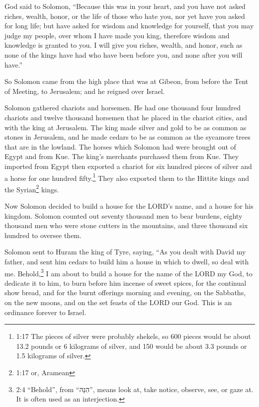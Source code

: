 \myverse{}God said to Solomon, “Because this was in your heart, and you
have not asked riches, wealth, honor, or the life of those who hate you, nor yet have you asked for long
life; but have asked for wisdom and knowledge for yourself, that you may judge my people, over whom I
have made you king,
\myverse{}therefore wisdom and knowledge is granted to you. I will give you riches,
wealth, and honor, such as none of the kings have had who have been before you, and none after you will
have.”

\myverse{}So Solomon came from the high place that was at Gibeon, from
before the Tent of Meeting, to Jerusalem; and he reigned over Israel.

\myverse{}Solomon gathered chariots and horsemen. He had one thousand four
hundred chariots and twelve thousand horsemen that he placed in the chariot cities, and with the king
at Jerusalem.
\myverse{}The king made silver and gold to be as common as stones in Jerusalem, and
he made cedars to be as common as the sycamore trees that are in the lowland.
\myverse{}The horses which Solomon had were brought out of Egypt and from Kue. The king’s
merchants purchased them from Kue.
\myverse{}They imported from Egypt then exported a chariot for six hundred pieces of
silver and a horse for one hundred fifty.\footnote{1:17 The pieces of silver were probably shekels, so 600 pieces would be about 13.2 pounds or 6 kilograms
	of silver, and 150 would be about 3.3 pounds or 1.5 kilograms of silver.} They also exported them
to the Hittite kings and the Syrian\footnote{1:17 or, Aramean} kings.


\mychapter{} \myverse*{}Now Solomon decided to build a house for the LORD’s name, and a
house for his kingdom.
\myverse{}Solomon counted out seventy thousand men to bear burdens, eighty thousand men
who were stone cutters in the mountains, and three thousand six hundred to oversee them.

\myverse{}Solomon sent to Huram the king of Tyre, saying, “As you dealt with
David my father, and sent him cedars to build him a house in which to dwell, so deal with me.
\myverse{}Behold,\footnote{2:4 “Behold”, from “הִנֵּה”, means look at, take notice, observe, see, or gaze at. It is
	often used as an interjection.} I am about to build a house for the name of the LORD my God, to
dedicate it to him, to burn before him incense of sweet spices, for the continual show bread, and for
the burnt offerings morning and evening, on the Sabbaths, on the new moons, and on the set feasts of the
LORD our God. This is an ordinance forever to Israel.

